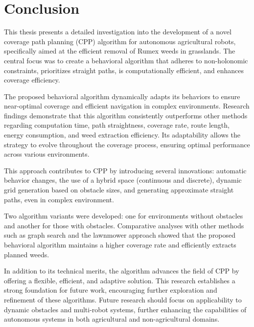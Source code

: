 
\chapter{Conclusion}

This thesis presents a detailed investigation into the development of a novel coverage path planning (CPP) algorithm for autonomous agricultural robots, specifically aimed at the efficient removal of Rumex weeds in grasslands. The central focus was to create a behavioral algorithm that adheres to non-holonomic constraints, prioritizes straight paths, is computationally efficient, and enhances coverage efficiency.

\vspace{3mm}   

The proposed behavioral algorithm dynamically adapts its behaviors to ensure near-optimal coverage and efficient navigation in complex environments. Research findings demonstrate that this algorithm consistently outperforms other methods regarding computation time, path straightness, coverage rate, route length, energy consumption, and weed extraction efficiency. Its adaptability allows the strategy to evolve throughout the coverage process, ensuring optimal performance across various environments.

\vspace{3mm}   

This approach contributes to CPP by introducing several innovations: automatic behavior changes, the use of a hybrid space (continuous and discrete), dynamic grid generation based on obstacle sizes, and  generating approximate straight paths, even in complex environment.

\vspace{3mm}   

Two algorithm variants were developed: one for environments without obstacles and another for those with obstacles. Comparative analyses with other methods such as graph search and the lawnmower approach showed that the proposed behavioral algorithm maintains a higher coverage rate and efficiently extracts planned weeds.

\vspace{3mm}   

In addition to its technical merits, the algorithm advances the field of CPP by offering a flexible, efficient, and adaptive solution. This research establishes a strong foundation for future work, encouraging further exploration and refinement of these algorithms. Future research should focus on applicability to dynamic obstacles and multi-robot systems, further enhancing the capabilities of autonomous systems in both agricultural and non-agricultural domains.
\newpage
